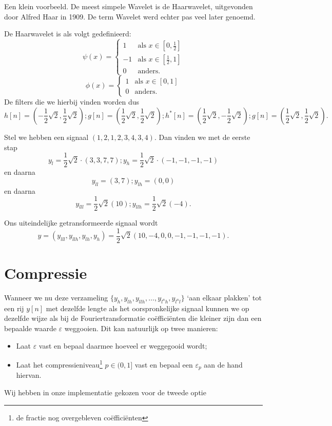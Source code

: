 \documentclass[11pt]{amsart}
\newcommand{\e}{\varepsilon}
\begin{document}
Een klein voorbeeld. De meest simpele Wavelet is de Haarwavelet, uitgevonden door Alfred Haar in 1909. De term Wavelet werd echter pas veel later genoemd.

De Haarwavelet is als volgt gedefinieerd:
\[
	\psi(x) = \begin{cases} 1 & \text{als } x \in [0,\frac{1}{2}] \\ -1 & \text{als } x \in [\frac{1}{2},1] \\ 0 & \text{anders.} \end{cases}
\]
\[
	\phi(x) = \begin{cases} 1 & \text{als } x \in [0,1] \\ 0 & \text{anders.} \end{cases}
\]
De filters die we hierbij vinden worden dus
\[
	h[n] = (-\frac{1}{2}\sqrt{2},\frac{1}{2}\sqrt{2}); g[n] = (\frac{1}{2}\sqrt{2},\frac{1}{2}\sqrt{2}); h^*[n] = (\frac{1}{2}\sqrt{2},-\frac{1}{2}\sqrt{2}); g[n] = (\frac{1}{2}\sqrt{2},\frac{1}{2}\sqrt{2}).
\]

Stel we hebben een signaal $(1,2,1,2,3,4,3,4)$. Dan vinden we met de eerste stap
\[
	y_l = \frac{1}{2}\sqrt{2}\cdot(3,3,7,7); y_h = \frac{1}{2}\sqrt{2}\cdot(-1,-1,-1,-1)
\]
en daarna
\[
	y_{ll} = (3, 7); y_{lh} = (0, 0)
\]
en daarna
\[
	y_{lll} = \frac{1}{2}\sqrt{2}(10); y_{llh} = \frac{1}{2}\sqrt{2}(-4).
\]

Ons uiteindelijke getransformeerde signaal wordt
\[
	y = (y_{lll},y_{llh},y_{lh},y_{h}) = \frac{1}{2}\sqrt{2}(10, -4, 0, 0, -1, -1, -1, -1).
\]

\section{Compressie}
Wanneer we nu deze verzameling $\{y_h, y_{lh}, y_{llh}, \ldots, y_{l^nh}, y_{l^nl}\}$ `aan elkaar plakken' tot een rij $y[n]$ met dezelfde lengte als het oorspronkelijke signaal kunnen we op dezelfde wijze als bij de Fouriertransformatie co\"effici\"enten die kleiner zijn dan een bepaalde waarde $\e$ weggooien. Dit kan natuurlijk op twee manieren: 
\begin{itemize}
\item Laat $\e$ vast en bepaal daarmee hoeveel er weggegooid wordt;
\item Laat het compressieniveau\footnote{de fractie nog overgebleven co\"effici\"enten} $p \in (0,1]$ vast en bepaal een $\e_p$ aan de hand hiervan.
\end{itemize}

Wij hebben in onze implementatie gekozen voor de tweede optie
\end{document}
